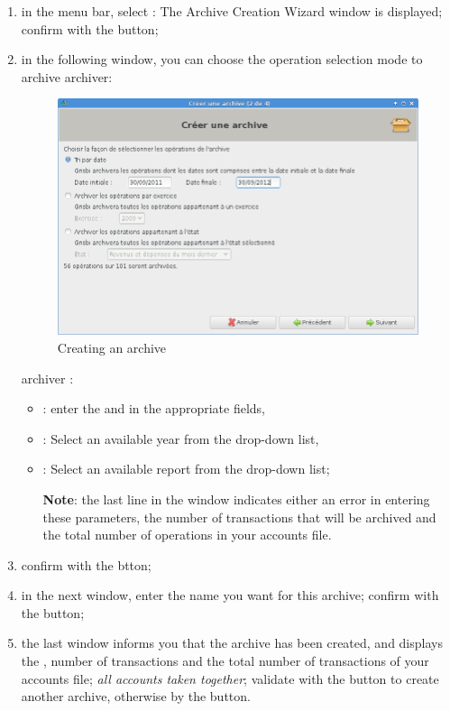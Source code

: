 \begin{enumerate}
	\item in the menu bar, select  : The Archive Creation Wizard window is displayed; confirm with the  button;
	\item in the following window, you can choose the operation selection mode to archive  \ifIllustration archiver:
	\begin{figure}[htbp]
	\begin{center}
	\includegraphics[scale=0.5]{image/screenshot/datamanagement_history_create}
	\end{center}
	\caption{Creating an archive}
	\label{datamanagement-history-create-img}
	\end{figure}
	\else archiver :
	\fi
	
		\begin{itemize}
			\item {}: enter the  and  in the appropriate fields,
			\item {}: Select an available year from the drop-down list,
			\item {}: Select an available report from the drop-down list;

			\textbf{Note}: the last line in the window indicates either an error in entering these parameters, the number of transactions that will be archived and the total number of operations in your accounts file.  
		\end{itemize}
	\item confirm with the  btton;
	\item in the next window, enter the name you want for this archive; confirm with the   button;
	\item the last window informs you that the archive has been created, and displays the , number of transactions and the total number of transactions of your accounts file;  \emph{all accounts taken together};  validate with the  button to create another archive, otherwise by the  button.
\end{enumerate}

